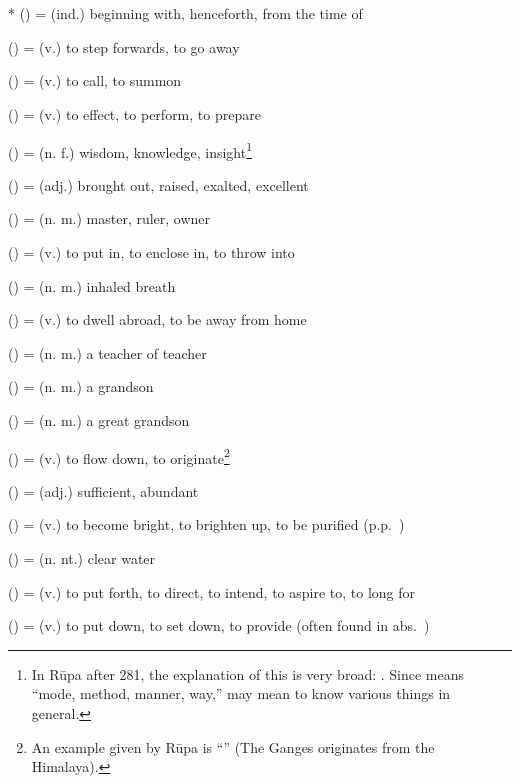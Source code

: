 \section*{}\label{upasagga:pa}
\begin{compactitem}
\item {}* () = (ind.) beginning with, henceforth, from the time of
\item {} () = (v.) to step forwards, to go away
\item {} () = (v.) to call, to summon
\item {} () = (v.) to effect, to perform, to prepare
\item {} () = (n. f.) wisdom, knowledge, insight\footnote{In R\=upa after 281, the explanation of this is very broad: . Since  means ``mode, method, manner, way,''  may mean to know various things in general.}
\item {} () = (adj.) brought out, raised, exalted, excellent
\item {} () = (n. m.) master, ruler, owner
\item {} () = (v.) to put in, to enclose in, to throw into
\item {} () = (n. m.) inhaled breath
\item {} () = (v.) to dwell abroad, to be away from home
\item {} () = (n. m.) a teacher of teacher
\item {} () = (n. m.) a grandson
\item {} () = (n. m.) a great grandson
\item {} () = (v.) to flow down, to originate\footnote{An example given by R\=upa is ``'' (The Ganges originates from the Himalaya).}
\item {} () = (adj.) sufficient, abundant
\item {} () = (v.) to become bright, to brighten up, to be purified (p.p.\ )
\item {} () = (n. nt.) clear water
\item {} () = (v.) to put forth, to direct, to intend, to aspire to, to long for
\item {} () = (v.) to put down, to set down, to provide (often found in abs.\ )
\end{compactitem}

